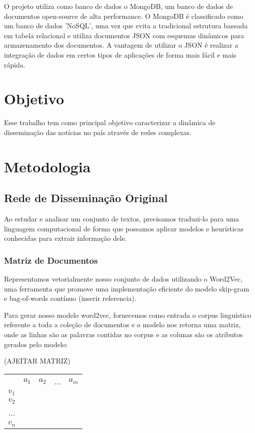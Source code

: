 \documentclass[a4paper,12pt]{article}
\begin{document}
O projeto utiliza como banco de dados o MongoDB, um banco de dados de documentos open-source de alta performance. O MongoDB é classificado como um banco de 
dados 'NoSQL', uma vez que evita a tradicional estrutura  baseada em tabela relacional e utiliza documentos JSON com esquemas dinâmicos para armazenamento 
dos documentos. A vantagem de utilizar o JSON é realizar a integração de dados em certos tipos de aplicações de forma mais fácil e mais rápida.

\section{Objetivo}

Esse trabalho tem como principal objetivo caracterizar a dinâmica de disseminação das notícias no país através de redes complexas.

\section{Metodologia}

\subsection{Rede de Disseminação Original}

Ao estudar e analisar um conjunto de textos, precisamos traduzi-lo para uma linguagem computacional de forma que possamos aplicar modelos e heurísticas 
conhecidas para extrair informação dele.

\subsubsection{Matriz de Documentos}

Representamos vetorialmente nosso conjunto de dados utilizando o Word2Vec, uma ferramenta que promove uma implementação eficiente do
modelo skip-gram e bag-of-words contínuo (inserir referencia).

Para gerar nosso modelo word2vec, fornecemos como entrada o corpus linguístico referente a toda a coleção de documentos
e o modelo nos retorna uma matriz, onde as linhas são as palavras contidas no corpus e as colunas são os atributos gerados pelo modelo:

(AJEITAR MATRIZ)

\begin{center}
 \begin{tabular}{ccccc}
          & $a_{1}$ & $a_{2}$ & ... & $a_{m}$ \\ \cline{2-5}
    $v_{1}$ &    &    &     &    \\
    $v_{2}$ &    &    &     &    \\
    ...  &    &    &     &    \\
    $v_{n}$ &    &    &     &    \\
    \end{tabular}
 
\end{center}
\end{document}
